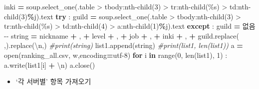 \documentclass[
]{article}
\newenvironment{Shaded}{\begin{snugshade}}{\end{snugshade}}
\newcommand{\BuiltInTok}[1]{#1}
\newcommand{\CharTok}[1]{\textcolor[rgb]{0.31,0.60,0.02}{#1}}
\newcommand{\CommentTok}[1]{\textcolor[rgb]{0.56,0.35,0.01}{\textit{#1}}}
\newcommand{\ControlFlowTok}[1]{\textcolor[rgb]{0.13,0.29,0.53}{\textbf{#1}}}
\newcommand{\DecValTok}[1]{\textcolor[rgb]{0.00,0.00,0.81}{#1}}
\newcommand{\KeywordTok}[1]{\textcolor[rgb]{0.13,0.29,0.53}{\textbf{#1}}}
\newcommand{\NormalTok}[1]{#1}
\newcommand{\OperatorTok}[1]{\textcolor[rgb]{0.81,0.36,0.00}{\textbf{#1}}}
\newcommand{\SpecialCharTok}[1]{\textcolor[rgb]{0.00,0.00,0.00}{#1}}
\newcommand{\StringTok}[1]{\textcolor[rgb]{0.31,0.60,0.02}{#1}}
\providecommand{\tightlist}{%
  \setlength{\itemsep}{0pt}\setlength{\parskip}{0pt}}
\begin{document}
\begin{Shaded}
\begin{Highlighting}[]
\NormalTok{        inki }\OperatorTok{=}\NormalTok{ soup.select\_one(}\StringTok{\textquotesingle{}.table \textgreater{} tbody:nth{-}child(3) \textgreater{} tr:nth{-}child(}\SpecialCharTok{\%s}\StringTok{) \textgreater{} td:nth{-}child(3)\textquotesingle{}}\OperatorTok{\%}\NormalTok{j).text}
        \ControlFlowTok{try}\NormalTok{ :}
\NormalTok{            guild }\OperatorTok{=}\NormalTok{ soup.select\_one(}\StringTok{\textquotesingle{}.table \textgreater{} tbody:nth{-}child(3) \textgreater{} tr:nth{-}child(}\SpecialCharTok{\%s}\StringTok{) \textgreater{} td:nth{-}child(4) \textgreater{} a:nth{-}child(1)\textquotesingle{}}\OperatorTok{\%}\NormalTok{j).text}
        \ControlFlowTok{except}\NormalTok{ :}
\NormalTok{            guild }\OperatorTok{=} \StringTok{\textquotesingle{}{-}{-} 없음 {-}{-}\textquotesingle{}}
\NormalTok{        string }\OperatorTok{=}\NormalTok{ nickname }\OperatorTok{+} \StringTok{\textquotesingle{},\textquotesingle{}} \OperatorTok{+}\NormalTok{ level }\OperatorTok{+} \StringTok{\textquotesingle{},\textquotesingle{}} \OperatorTok{+}\NormalTok{ job }\OperatorTok{+} \StringTok{\textquotesingle{},\textquotesingle{}} \OperatorTok{+}\NormalTok{ inki }\OperatorTok{+} \StringTok{\textquotesingle{},\textquotesingle{}} \OperatorTok{+}\NormalTok{ guild.replace(}\StringTok{\textquotesingle{} \textquotesingle{}}\NormalTok{,}\StringTok{\textquotesingle{}\textquotesingle{}}\NormalTok{).replace(}\StringTok{\textquotesingle{}}\CharTok{\textbackslash{}n}\StringTok{\textquotesingle{}}\NormalTok{,}\StringTok{\textquotesingle{}\textquotesingle{}}\NormalTok{)}
        \CommentTok{\#print(string)}
\NormalTok{        list1.append(string)}
    \CommentTok{\#print(list1, len(list1))}
\NormalTok{a }\OperatorTok{=} \BuiltInTok{open}\NormalTok{(}\StringTok{\textquotesingle{}ranking\_all.csv\textquotesingle{}}\NormalTok{, }\StringTok{\textquotesingle{}w\textquotesingle{}}\NormalTok{,encoding}\OperatorTok{=}\StringTok{\textquotesingle{}utf{-}8\textquotesingle{}}\NormalTok{)}
\ControlFlowTok{for}\NormalTok{ i }\KeywordTok{in} \BuiltInTok{range}\NormalTok{(}\DecValTok{0}\NormalTok{, }\BuiltInTok{len}\NormalTok{(list1), }\DecValTok{1}\NormalTok{) :}
\NormalTok{    a.write(list1[i] }\OperatorTok{+} \StringTok{\textquotesingle{}}\CharTok{\textbackslash{}n}\StringTok{\textquotesingle{}}\NormalTok{)}
\NormalTok{a.close()}
\end{Highlighting}
\end{Shaded}

\begin{itemize}
\tightlist
\item
  `각 서버별' 항목 가져오기
\end{itemize}
\end{document}
